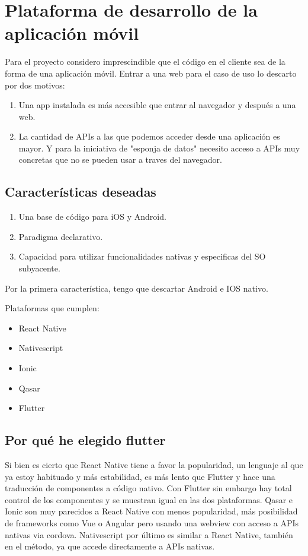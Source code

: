 \chapter{Plataforma de desarrollo de la aplicación móvil}
Para el proyecto considero imprescindible que el código en el cliente sea de la forma de una aplicación móvil. 
Entrar a una web para el caso de uso lo descarto por dos motivos:
\begin{enumerate}
  \item Una app instalada es más accesible que entrar al navegador y después a una web.
  \item La cantidad de APIs a las que podemos acceder desde una aplicación es mayor. Y para la iniciativa de "esponja de datos" necesito acceso a APIs muy concretas que no se pueden usar a traves del navegador.
\end{enumerate}
\section{Características deseadas}

\begin{enumerate}
  \item Una base de código para iOS y Android.
  \item Paradigma declarativo.
  \item Capacidad para utilizar funcionalidades nativas y especificas del SO subyacente.
\end{enumerate}

Por la primera característica, tengo que descartar Android e IOS nativo. 

Plataformas que cumplen: 
\begin{itemize}
  \item React Native
  \item Nativescript
  \item Ionic
  \item Qasar
  \item Flutter
\end{itemize}

\section{Por qué he elegido flutter}

Si bien es cierto que React Native tiene a favor la popularidad, un lenguaje al que ya estoy habituado y más estabilidad, es más lento que Flutter y hace una traducción de componentes a código nativo.
Con Flutter sin embargo hay total control de los componentes y se muestran igual en las dos plataformas. Qasar e Ionic son muy parecidos a React Native con menos popularidad, más posibilidad de frameworks como Vue o Angular pero usando 
una webview con acceso a APIs nativas via cordova. Nativescript por último es similar a React Native, también en el método, ya que accede directamente a APIs nativas.
